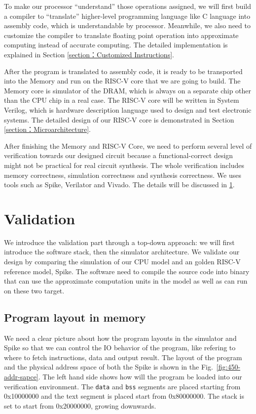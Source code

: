 To make our processor ``understand'' those operations assigned, we will first build a compiler to ``translate'' higher-level programming language like C language into assembly code, which is understandable by processor. Meanwhile, we also need to customize the compiler to translate floating point operation into approximate computing instead of accurate computing. The detailed implementation is explained in Section \ref{section：Customized Instructions}.

After the program is translated to assembly code, it is ready to be transported into the Memory and run on the RISC-V core that we are going to build. The Memory core is simulator of the DRAM, which is always on a separate chip other than the CPU chip in a real case. The RISC-V core will be written in System Verilog, which is hardware description language used to design and test electronic systems. The detailed design of our RISC-V core is demonstrated in Section \ref{section：Microarchitecture}. 

After finishing the Memory and RISC-V Core, we need to perform several level of verification towards our designed circuit because a functional-correct design might not be practical for real circuit synthesis. The whole verification includes memory correctness, simulation correctness and synthesis correctness. We uses tools such as Spike, Verilator and Vivado. The details will be discussed in \ref{section: Validation}.

\section{Validation} \label{section: Validation}
We introduce the validation part through a top-down approach: we will first introduce the software stack, then the simulator architecture. We validate our design by comparing the simulation of our CPU model and an golden RISC-V reference model, Spike. The software need to compile the source code into binary that can use the approximate computation units in the model as well as can run on these two target. 

\subsection{Program layout in memory} %
We need a clear picture about how the program layouts in the simulator and Spike so that we can control the IO behavior of the program, like refering to where to fetch instructions, data and output result. The layout of the program and the physical address space of both the Spike is shown in the Fig.~\ref{fig:450-addr-sapce}. The left hand side shows how will the program be loaded into our verification environment. The \texttt{data} and \texttt{bss} segments are placed starting from 0x10000000 and the text segment is placed start from 0x80000000. The stack is set to start from 0x20000000, growing downwards. 


